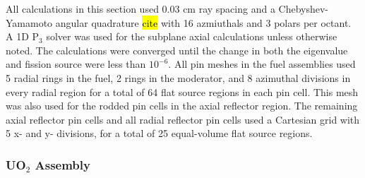 All calculations in this section used 0.03 cm ray spacing and a Chebyshev-Yamamoto angular quadrature \hl{cite} with 16 azmiuthals and 3 polars per octant.  A 1D P$_3$ solver was used for the subplane axial calculations unless otherwise noted.  The calculations were converged until the change in both the eigenvalue and fission source were less than $10^{-6}$.  All pin meshes in the fuel assemblies used 5 radial rings in the fuel, 2 rings in the moderator, and 8 azimuthal divisions in every radial region for a total of 64 flat source regions in each pin cell.  This mesh was also used for the rodded pin cells in the axial reflector region.  The remaining axial reflector pin cells and all radial reflector pin cells used a Cartesian grid with 5 x- and y- divisions, for a total of 25 equal-volume flat source regions.

\subsubsection{UO\texorpdfstring{$_2$}{2} Assembly}

